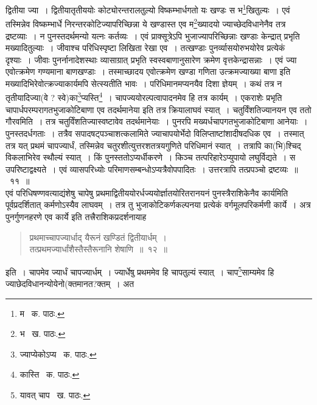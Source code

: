 \documentclass[11pt, openany]{book}
\begin{document}
\noindent द्वितीया ज्या~। द्वितीयातृतीययोः कोट्योरन्तरालतुल्यो विष्कम्भार्धगतो यः खण्डः स भ\renewcommand{\thefootnote}{१}\footnote{म \textendash\ क. पाठः.}खितुल्यः~। एवं तस्मिन्नेव विष्कम्भार्धे
निरन्तरकोटिज्यापरिच्छिन्ना ये खण्डास्त एव म\renewcommand{\thefootnote}{२}\footnote{भ \textendash\ ख. पाठः.}ख्यादयो ज्याच्छेदविधानेनैव तत्र द्रष्टव्याः~। न पुनस्तदर्थमन्यो यत्नः कर्तव्यः~। एवं प्राक्सूत्रेऽपि भुजाज्यापरिच्छिन्नाः खण्डाः केन्द्रात् प्रभृति मख्यादितुल्याः~। जीवाश्च परिधिस्पृष्टा लिखिता रेखा एव~। तत्खण्डाः पुनर्व्यासयोरुभयोरेव प्रत्येकं दृश्याः~। जीवाः पुनर्नानादेशस्थाः व्यासाग्रात् प्रभृति स्वस्वबाणानुसारेण क्रमेण वृत्तकेन्द्रासन्नाः~। एवं ज्या एवोत्क्रमेण गण्यमाना बाणखण्डाः~। तस्माच्छादय एवोत्क्रमेण खण्डा गणिता उत्क्रमज्याख्या बाणा इति मख्यादिभिरेवोत्क्रज्याकार्यमपि सेत्स्यतीति भावः~। परिधिमानमप्यनयैव दिशा ज्ञेयम्~। कथं तत्र न तृतीयादिज्या(वे ? स्वे)का\renewcommand{\thefootnote}{३}\footnote{ज्याप्येकोऽप्य \textendash\ क. पाठः.}प्यस्ति\renewcommand{\thefootnote}{४}\footnote{कास्ति \textendash\ क. पाठः.}~। चापज्ययोरल्पत्वापादनमेव हि तत्र कार्यम्~। एकराशेः प्रभृति चापार्धपरम्परागतभुजाकोटिबाणा एव तदर्थमानेया इति तत्र क्रियालाघवं स्यात्~। चतुर्विंशतिज्यानयन एव ततो गौरवमिति~। तत्र चतुर्विंशतिज्यास्वष्टावेव तदर्थमानेयाः~। पुनरपि मख्यर्धचापगतभुजाकोटिबाणा आनेयाः~। पुनस्तदर्धगताः~। तत्रैव सपादषट्पञ्चाशत्कलामिते ज्याचापयोर्भेदो विलिप्ताष्टांशादीषदधिक एव~। तस्मात् तत्र यत् प्रथमं चापज्यार्धं, तस्मिन्नेव चतुरशीत्युत्तरशतत्रयगुणिते परिधिमानं स्यात्~। तत्रापि
का(भि)श्चिद् विकलाभिरेव स्थौल्यं स्यात्~। किं पुनस्ततोऽप्यर्धीकरणे~। किञ्च तत्परिहारेऽप्युपायो लघुर्विद्यते~। स उपरिष्टाद्वक्ष्यते~। एवं व्यासपरिध्योः परिमाणसम्बन्धोऽप्यत्रैवोपपादितः~। उत्तरत्रापि तत्प्रपञ्चो द्रष्टव्यः~॥~११~॥\\

एवं परिधिषण्णवत्याद्यंशेषु चापेषु प्रथमाद्वितीययोरर्धज्ययोर्ज्ञातयोरितरानयनं पुनस्त्रैराशिकेनैव कार्यमिति पूर्वप्रदर्शितात् कर्मणोऽस्यैव लाघवम्~। तत्र तु
भुजाकोटिकर्णकल्पनया प्रत्येकं वर्गमूलपरिकर्मणी कार्ये~। अत्र पुनर्गुणनहरणे एव कार्ये इति तत्त्रैराशिकप्रदर्शनायाह\textendash 

\begin{quote}
{\ab प्रथमाच्चापज्यार्धाद् यैरूनं खण्डितं द्वितीयार्धम्~।\\
तत्प्रथमज्यार्धांशैस्तैस्तैरूनानि शेषाणि~॥~१२~॥}
\end{quote}

इति~। चापमेव ज्यार्धं चापज्यार्धम्~। ज्यार्धेषु प्रथममेव हि चापतुल्यं स्यात्~। चाप\renewcommand{\thefootnote}{५}\footnote{यावत् चाप \textendash\ ख. पाठः.}साम्यमेव हि ज्याछेदविधानन्योयेनो(क्तमानत?क्तम्~। अत
\end{document}
